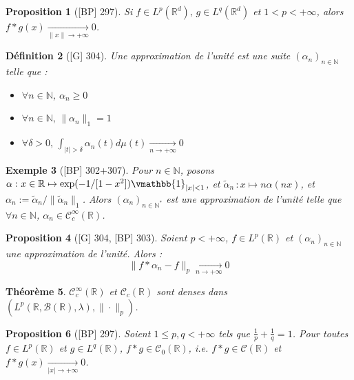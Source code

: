 \documentclass[10pt, a4paper, parskip=full, twoside, twocolumn]{report}
\newtheorem{definition}{Définition}
\newtheorem{theorem}[definition]{Théorème}
\newtheorem{proposition}[definition]{Proposition}
\newtheorem{example}[definition]{Exemple}
\newcommand{\IN}{\mathbb{N}}
\newcommand{\IR}{\mathbb{R}}
\newcommand{\B}{\mathcal{B}}
\begin{document}
\begin{proposition}[\textnormal{[BP] 297}]
	Si $f\in L^p(\IR^d),\, g\in L^q(\IR^d)$ et $1< p < +\infty$, alors $f*g(x)\xrightarrow[\|x\|\to +\infty]{} 0$.
\end{proposition}

\begin{definition}[\textnormal{[G] 304}]
	Une \emph{approximation de l'unité} est une suite $\left(\alpha_n\right)_{n\in\IN}$ telle que :
	\begin{itemize}
		\item $\forall n\in\IN$, $\alpha_n \geq 0$
		\item $\forall n\in\IN,\, \|\alpha_n\|_1 = 1$
		\item $\forall \delta > 0,\, \int_{\lvert t\rvert > \delta}\alpha_n(t)d\mu(t)\xrightarrow[n\to +\infty]{} 0$
	\end{itemize}
\end{definition}

\begin{example}[\textnormal{[BP] 302+307}]
	Pour $n\in \IN$, posons $\alpha\,\colon x\in\IR\mapsto \exp(-1/[1-x^2])\vmathbb{1}_{\lvert x\rvert < 1}$, et $\tilde{\alpha}_n\,\colon x\mapsto n\alpha(nx)$,
	et $\alpha_n := \tilde{\alpha}_n/\|\tilde{\alpha}_n\|_1$.
	Alors $\left(\alpha_n\right)_{n\in\IN^*}$ est une approximation de l'unité telle que $\forall n\in \IN$, $\alpha_n\in \mathcal{C}^{\infty}_c(\IR)$.
\end{example}

\begin{proposition}[\textnormal{[G] 304, [BP] 303}]
	Soient $p<+\infty$, $f\in L^p(\IR)$ et $\left(\alpha_n\right)_{n\in\IN}$ une approximation de l'unité. Alors :
	$$\|f*\alpha_n - f\|_p\xrightarrow[n\to +\infty]{} 0$$
\end{proposition}

\begin{theorem}
	$\mathcal{C}^{\infty}_c(\IR)$ et $\mathcal{C}_c(\IR)$ sont denses dans $(L^p(\IR, \B(\IR), \lambda), \|\cdot\|_p)$.
\end{theorem}

\begin{proposition}[\textnormal{[BP] 297}]
	Soient $1\leq p, q < +\infty$ tels que $\frac{1}{p} + \frac{1}{q} = 1$. Pour toutes $f\in L^p(\IR)$ et $g\in L^q(\IR)$, $f*g\in\mathcal{C}_0(\IR)$, \emph{i.e.} $f*g \in \mathcal{C}(\IR)$ et $f*g(x)\xrightarrow[\lvert x\rvert \to +\infty]{} 0$.
\end{proposition}
\end{document}
